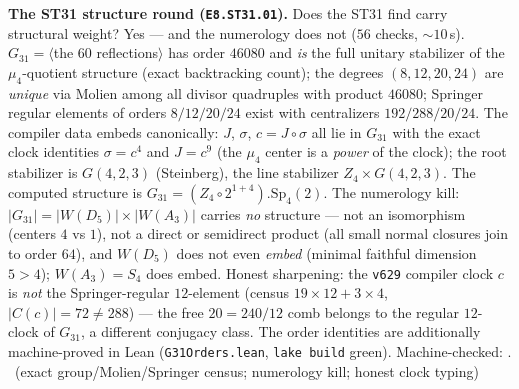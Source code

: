 \par\smallskip\noindent\textbf{The ST31 structure round
(\texttt{E8.ST31.01}).}
Does the ST31 find carry structural weight?  Yes --- and the
numerology does not ($56$ checks, ${\sim}10$\,s).  $G_{31}=\langle$the
$60$ reflections$\rangle$ has order $46080$ and \emph{is} the full
unitary stabilizer of the $\mu_4$-quotient structure (exact
backtracking count); the degrees $(8,12,20,24)$ are \emph{unique} via
Molien among all divisor quadruples with product $46080$; Springer
regular elements of orders $8/12/20/24$ exist with centralizers
$192/288/20/24$.  The compiler data embeds canonically: $J$, $\sigma$,
$c=J\circ\sigma$ all lie in $G_{31}$ with the exact clock identities
$\sigma=c^4$ and $J=c^9$ (the $\mu_4$ center is a \emph{power} of the
clock); the root stabilizer is $G(4,2,3)$ (Steinberg), the line
stabilizer $Z_4\times G(4,2,3)$.  The computed structure is
$G_{31}=(Z_4\circ2^{1+4}).\mathrm{Sp}_4(2)$.  The numerology kill:
$|G_{31}|=|W(D_5)|\times|W(A_3)|$ carries \emph{no} structure ---
not an isomorphism (centers $4$ vs $1$), not a direct or semidirect
product (all small normal closures join to order $64$), and $W(D_5)$
does not even \emph{embed} (minimal faithful dimension $5>4$);
$W(A_3)=S_4$ does embed.  Honest sharpening: the \texttt{v629}
compiler clock $c$ is \emph{not} the Springer-regular $12$-element
(census $19\times12+3\times4$, $|C(c)|=72\ne288$) --- the free
$20=240/12$ comb belongs to the regular $12$-clock of $G_{31}$, a
different conjugacy class.  The order identities are additionally
machine-proved in Lean (\texttt{G31Orders.lean}, \texttt{lake build}
green).
Machine-checked: .
\mE\ (exact group/Molien/Springer census; numerology kill; honest
clock typing)
\par\smallskip

